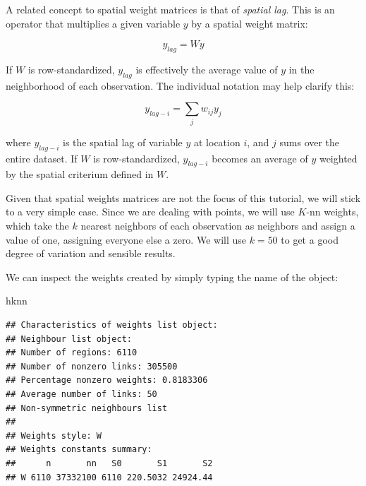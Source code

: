 \documentclass[
]{book}
\newenvironment{Shaded}{\begin{snugshade}}{\end{snugshade}}
\newcommand{\CommentTok}[1]{\textcolor[rgb]{0.56,0.35,0.01}{\textit{#1}}}
\newcommand{\DataTypeTok}[1]{\textcolor[rgb]{0.13,0.29,0.53}{#1}}
\newcommand{\DecValTok}[1]{\textcolor[rgb]{0.00,0.00,0.81}{#1}}
\newcommand{\KeywordTok}[1]{\textcolor[rgb]{0.13,0.29,0.53}{\textbf{#1}}}
\newcommand{\NormalTok}[1]{#1}
\newcommand{\OperatorTok}[1]{\textcolor[rgb]{0.81,0.36,0.00}{\textbf{#1}}}
\newcommand{\StringTok}[1]{\textcolor[rgb]{0.31,0.60,0.02}{#1}}
\begin{document}
A related concept to spatial weight matrices is that of \emph{spatial lag}. This is an operator that multiplies a given variable \(y\) by a spatial weight matrix:

\[
y_{lag} = W y
\]

If \(W\) is row-standardized, \(y_{lag}\) is effectively the average value of \(y\) in the neighborhood of each observation. The individual notation may help clarify this:

\[
y_{lag-i} = \displaystyle \sum_j w_{ij} y_j
\]

where \(y_{lag-i}\) is the spatial lag of variable \(y\) at location \(i\), and \(j\) sums over the entire dataset. If \(W\) is row-standardized, \(y_{lag-i}\) becomes an average of \(y\) weighted by the spatial criterium defined in \(W\).

Given that spatial weights matrices are not the focus of this tutorial, we will stick to a very simple case. Since we are dealing with points, we will use \(K\)-nn weights, which take the \(k\) nearest neighbors of each observation as neighbors and assign a value of one, assigning everyone else a zero. We will use \(k=50\) to get a good degree of variation and sensible results.

\begin{Shaded}
\end{Shaded}

We can inspect the weights created by simply typing the name of the object:

\begin{Shaded}
\begin{Highlighting}[]
\NormalTok{hknn}
\end{Highlighting}
\end{Shaded}

\begin{verbatim}
## Characteristics of weights list object:
## Neighbour list object:
## Number of regions: 6110 
## Number of nonzero links: 305500 
## Percentage nonzero weights: 0.8183306 
## Average number of links: 50 
## Non-symmetric neighbours list
## 
## Weights style: W 
## Weights constants summary:
##      n       nn   S0       S1       S2
## W 6110 37332100 6110 220.5032 24924.44
\end{verbatim}
\end{document}

